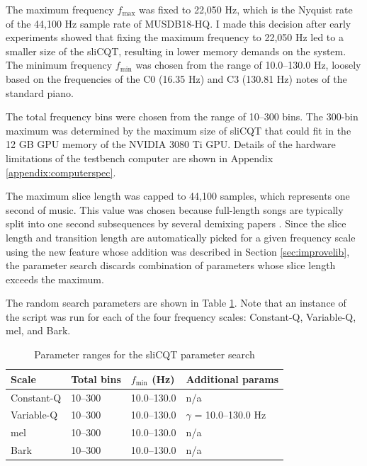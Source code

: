 \documentclass[report.tex]{subfiles}
\begin{document}
The maximum frequency $f_{\text{max}}$ was fixed to 22,050 Hz, which is the Nyquist rate of the 44,100 Hz sample rate of MUSDB18-HQ. I made this decision after early experiments showed that fixing the maximum frequency to 22,050 Hz led to a smaller size of the sliCQT, resulting in lower memory demands on the system. The minimum frequency $f_{\text{min}}$ was chosen from the range of 10.0--130.0 Hz, loosely based on the frequencies of the C0 (16.35 Hz) and C3 (130.81 Hz) notes of the standard piano.

The total frequency bins were chosen from the range of 10--300 bins. The 300-bin maximum was determined by the maximum size of sliCQT that could fit in the 12 GB GPU memory of the NVIDIA 3080 Ti GPU. Details of the hardware limitations of the testbench computer are shown in Appendix \ref{appendix:computerspec}.

The maximum slice length was capped to 44,100 samples, which represents one second of music. This value was chosen because full-length songs are typically split into one second subsequences by several demixing papers \parencite{plumbley1, plumbley2, demucs}. Since the slice length and transition length are automatically picked for a given frequency scale using the new feature whose addition was described in Section \ref{sec:improvelib}, the parameter search discards combination of parameters whose slice length exceeds the maximum.

The random search parameters are shown in Table \ref{table:slicqparams}. Note that an instance of the script was run for each of the four frequency scales: Constant-Q, Variable-Q, mel, and Bark.

\begin{table}[ht]
	\centering
	\caption{Parameter ranges for the sliCQT parameter search}
	\label{table:slicqparams}
\begin{tabular}{ |l|l|l|l| }
	 \hline
	 Scale & Total bins & $f_{\text{min}}$ (Hz) & Additional params \\
	 \hline
	 \hline
	 Constant-Q & 10--300 & 10.0--130.0 & n/a \\
	 \hline
	 Variable-Q & 10--300 & 10.0--130.0 & $\gamma$ = 10.0--130.0 Hz \\
	 \hline
	 mel & 10--300 & 10.0--130.0 & n/a \\
	 \hline
	 Bark & 10--300 & 10.0--130.0 & n/a \\
	 \hline
\end{tabular}
\end{table}
\end{document}
